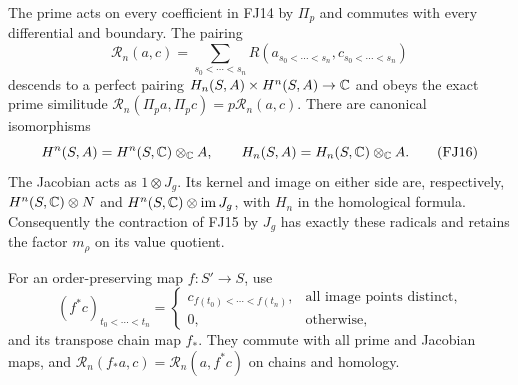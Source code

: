 \begin{theorem}
\label{fj:thm:support}
The prime acts on every coefficient in FJ14 by $\Pi_p$ and commutes
with every differential and boundary. The pairing
\[
 \mathcal R_n(a,c)=\sum_{s_0<\cdots<s_n}R(a_{s_0<\cdots<s_n},
                                           c_{s_0<\cdots<s_n})
 \tag{FJ15}\label{fj:fj:chain-pair}
\]
descends to a perfect pairing
$H_n(S,A)\times H^n(S,A)\to\mathbb C$ and obeys the exact prime
similitude $\mathcal R_n(\Pi_pa,\Pi_pc)=p\mathcal R_n(a,c)$.
There are canonical isomorphisms
\[
 H^n(S,A)=H^n(S,\mathbb C)\otimes_\mathbb C A,\qquad
 H_n(S,A)=H_n(S,\mathbb C)\otimes_\mathbb C A.
 \tag{FJ16}\label{fj:fj:kunneth}
\]
The Jacobian acts as $1\otimes J_g$. Its kernel and image on either
side are, respectively, $H^{n}(S,\mathbb C)\otimes N$ and
$H^{n}(S,\mathbb C)\otimes\operatorname{im} J_g$, with $H_n$ in the homological formula.
Consequently the contraction of FJ15 by $J_g$ has exactly these
radicals and retains the factor $m_\rho$ on its value quotient.

For an order-preserving map $f:S'\to S$, use
\[
 (f^*c)_{t_0<\cdots<t_n}=
 \begin{cases}
 c_{f(t_0)<\cdots<f(t_n)},&\text{all image points distinct},\\
 0,&\text{otherwise},
 \end{cases}
 \tag{FJ17}
\]
and its transpose chain map $f_*$. They commute with all prime and
Jacobian maps, and
$\mathcal R_n(f_*a,c)=\mathcal R_n(a,f^*c)$ on chains and homology.
\end{theorem}
